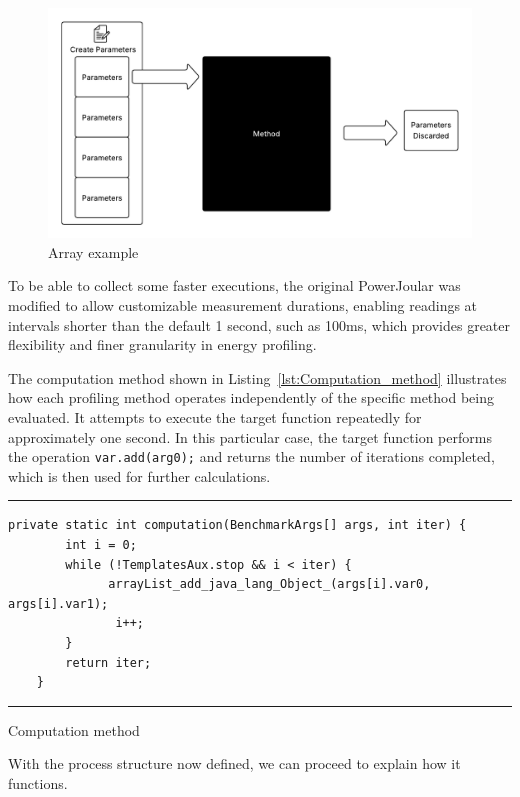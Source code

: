 \begin{figure}[htbp]
  \centering
  \includegraphics[width = 1 \textwidth]{figures/array.pdf}
  \caption{Array example}
  \label{fig:array}
\end{figure}

To be able to collect some faster executions, the original PowerJoular was modified to allow customizable measurement durations, enabling readings at intervals shorter than the default 1 second, such as 100ms, which provides greater flexibility and finer granularity in energy profiling.

The computation method shown in Listing~\ref{lst:Computation_method} illustrates how each profiling method operates independently of the specific method being evaluated. It attempts to execute the target function repeatedly for approximately one second. In this particular case, the target function performs the operation \texttt{var.add(arg0);} and returns the number of iterations completed, which is then used for further calculations.

\begin{listing}[htbp]%
\noindent\rule{\linewidth}{0.4pt}
\begin{verbatim}
private static int computation(BenchmarkArgs[] args, int iter) {
        int i = 0;
        while (!TemplatesAux.stop && i < iter) {
              arrayList_add_java_lang_Object_(args[i].var0, args[i].var1);
               i++;
        }
        return iter;
    }
\end{verbatim}
\noindent\rule{\linewidth}{0.4pt}
\caption{Computation method}            
\label{lst:Computation_method}
\end{listing}


With the process structure now defined, we can proceed to explain how it functions.

